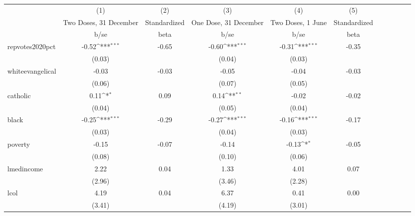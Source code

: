 {
\def\sym#1{\ifmmode^{#1}\else\(^{#1}\)\fi}
\begin{tabular}{l*{5}{cc}}
\hline\hline
            &\multicolumn{1}{c}{(1)}         &\multicolumn{1}{c}{(2)}&\multicolumn{1}{c}{(3)}         &\multicolumn{1}{c}{(4)}         &\multicolumn{1}{c}{(5)}\\
            &Two Doses, 31 December         &Standardized&One Dose, 31 December         &Two Doses, 1 June         &Standardized\\
            &        b/se         &        beta&        b/se         &        b/se         &        beta\\
\hline
repvotes2020pct&       -0.52\sym{***}&       -0.65&       -0.60\sym{***}&       -0.31\sym{***}&       -0.35\\
            &      (0.03)         &            &      (0.04)         &      (0.03)         &            \\
whiteevangelical&       -0.03         &       -0.03&       -0.05         &       -0.04         &       -0.03\\
            &      (0.06)         &            &      (0.07)         &      (0.05)         &            \\
catholic    &        0.11\sym{*}  &        0.09&        0.14\sym{**} &       -0.02         &       -0.02\\
            &      (0.04)         &            &      (0.05)         &      (0.04)         &            \\
black       &       -0.25\sym{***}&       -0.29&       -0.27\sym{***}&       -0.16\sym{***}&       -0.17\\
            &      (0.03)         &            &      (0.04)         &      (0.03)         &            \\
poverty     &       -0.15         &       -0.07&       -0.14         &       -0.13\sym{*}  &       -0.05\\
            &      (0.08)         &            &      (0.10)         &      (0.06)         &            \\
lmedincome  &        2.22         &        0.04&        1.33         &        4.01         &        0.07\\
            &      (2.96)         &            &      (3.46)         &      (2.28)         &            \\
lcol        &        4.19         &        0.04&        6.37         &        0.41         &        0.00\\
            &      (3.41)         &            &      (4.19)         &      (3.01)         &            \\

\end{tabular}}
